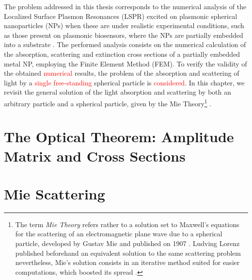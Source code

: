 \documentclass[11pt]{Latex/Classes/PhDthesisPSnPDF}
\begin{document}
  The problem addressed in this thesis corresponds to the numerical analysis of the Localized Surface Plasmon Resonances (LSPR)  excited on plasmonic spherical nanoparticles (NPs) when these are under realistic experimental conditions, such as those present on plasmonic biosensors, where the NPs are partially embedded into a substrate \cite{moirangthem_enhanced_2012}. The performed analysis consists on the numerical calculation of the absorption, scattering and extinction  cross sections of a partially embedded metal NP, employing the Finite Element Method (FEM). To verify the validity of the obtained \textcolor{red}{numerical} results, the problem of the absorption and scattering of light by a \textcolor{red}{single free-standing} spherical particle is \textcolor{red}{considered}. In this chapter, we revisit the general solution of the light absorption and scattering by both an arbitrary particle and a spherical particle, given by the Mie Theory\footnote{The term \emph{Mie Theory} refers rather to a solution set to Maxwell's equations for the scattering of an electromagnetic plane wave due to a spherical particle, developed by Gustav Mie and published on 1907 \cite{mie_beitrage_1908}. Ludving Lorenz published beforehand an equivalent solution to the same scattering problem nevertheless, Mie's solution consists in an iterative method suited for easier computations, which boosted its spread \cite{horvath_gustav_2009}. } \cite{bohren_absorption_1983}.

	\section{The Optical Theorem: Amplitude Matrix and Cross Sections}
	 \label{s:AmpMatCrossSect}
	 

	\section{Mie Scattering}
	  \label{s:Mie}
\end{document}
